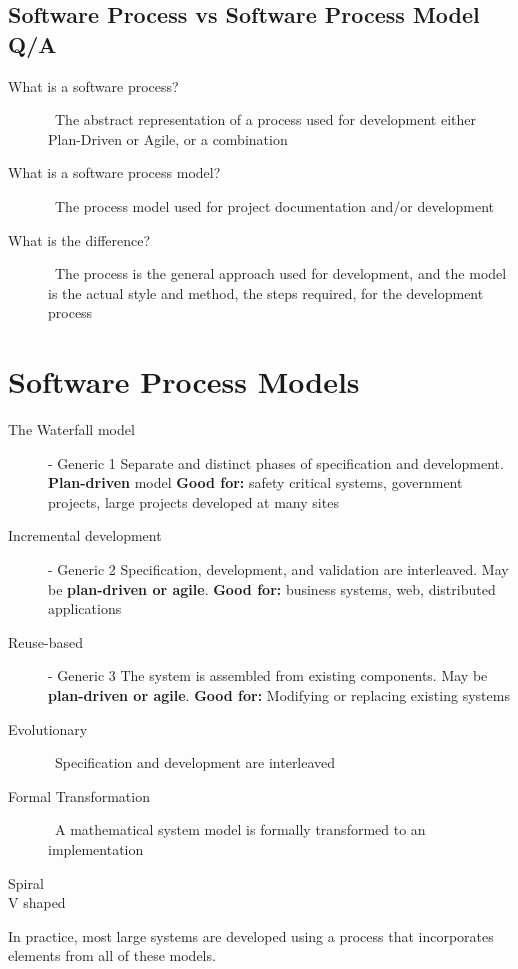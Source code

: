 \documentclass{report}
\begin{document}
\subsection{Software Process vs Software Process Model Q/A}
\begin{description}
  \item [What is a software process?] \ \newline The abstract representation of a process used for development either Plan-Driven or Agile, or a combination
  \item [What is a software process model?] \ \newline The process model used for project documentation and/or development
  \item [What is the difference?] \ \newline The process is the general approach used for development, and the model is the actual style and method, the steps required, for the development process
\end{description}

\section{Software Process Models}
\begin{description}
  \item [The Waterfall model] - Generic 1 \newline Separate and distinct phases of specification and development.  \textbf{Plan-driven} model\newline
  \textbf{Good for:} safety critical systems, government projects, large projects developed at many sites
  \item [Incremental development] - Generic 2 \newline Specification, development, and validation are interleaved. May be \textbf{plan-driven or agile}.\newline
  \textbf{Good for:} business systems, web, distributed applications
  \item [Reuse-based] - Generic 3 \newline The system is assembled from existing components. May be \textbf{plan-driven or agile}.\newline
  \textbf{Good for:} Modifying or replacing existing systems
  \item [Evolutionary] \ \newline Specification and development are interleaved
  \item [Formal Transformation] \ \newline A mathematical system model is formally transformed to an implementation
  \item [Spiral]
  \item [V shaped]
\end{description}
In practice, most large systems are developed using a process that incorporates elements from all of these models.
\end{document}

